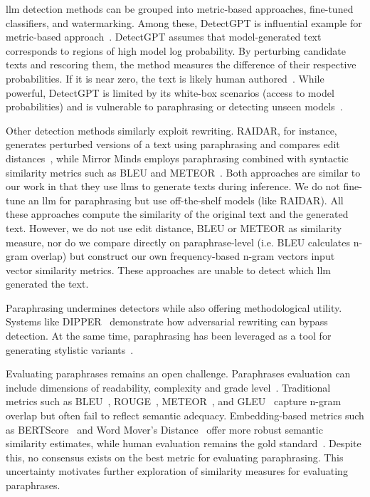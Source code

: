 \ac{llm} detection methods can be grouped into metric-based approaches, fine-tuned classifiers, and watermarking. 
Among these, DetectGPT is influential example for metric-based approach~\citep{wang_stumbling_2024}.
DetectGPT assumes that model-generated text corresponds to regions of high model log probability. 
By perturbing candidate texts and rescoring them, the method measures the difference of their respective probabilities.
If it is near zero, the text is likely human authored~\citep{mitchell_detectgpt_2023}. 
While powerful, DetectGPT is limited by its white-box scenarios (access to model probabilities) and is vulnerable to paraphrasing or detecting unseen models~\citep{Wu_ODD_challenges_2025}.

Other detection methods similarly exploit rewriting. 
RAIDAR, for instance, generates perturbed versions of a text using paraphrasing and compares edit distances~\citep{mao_raidar_2024}, while Mirror Minds employs paraphrasing combined with syntactic similarity metrics such as BLEU and METEOR~\citep{baradia_mirror_2025}. 
Both approaches are similar to our work in that they use \acp{llm} to generate texts during inference.
We do not fine-tune an \ac{llm} for paraphrasing but use off-the-shelf models (like RAIDAR).
All these approaches compute the similarity of the original text and the generated text.
However, we do not use edit distance, BLEU or METEOR as similarity measure, nor do we compare directly on paraphrase-level (i.e. BLEU calculates n-gram overlap) but construct our own frequency-based n-gram vectors input vector similarity metrics.
These approaches are unable to detect which \ac{llm} generated the text.


Paraphrasing undermines detectors while also offering methodological utility. 
Systems like DIPPER~\citep{Krishna_dipper_2023} demonstrate how adversarial rewriting can bypass detection. 
At the same time, paraphrasing has been leveraged as a tool for generating stylistic variants~\citep{mao_raidar_2024,baradia_mirror_2025}.

Evaluating paraphrases remains an open challenge. 
Paraphrases evaluation can include dimensions of readability, complexity and grade level~\citep{Thomas_cross_topic_24}.
Traditional metrics such as BLEU~\citep{papineni_bleu_2001}, ROUGE~\citep{lin_rouge_2004}, METEOR~\citep{banerjee_METEOR_2005}, and GLEU~\citep{kurt_pehlivanoglu_comparative_2024} capture n-gram overlap but often fail to reflect semantic adequacy. 
Embedding-based metrics such as BERTScore~\citep{hanna_fine_grained_2021} and Word Mover's Distance~\citep{gohsen_captions_2023} offer more robust semantic similarity estimates, while human evaluation remains the gold standard~\citep{zhou_paraphrase_2021}. 
Despite this, no consensus exists on the best metric for evaluating paraphrasing. 
This uncertainty motivates further exploration of similarity measures for evaluating paraphrases.




